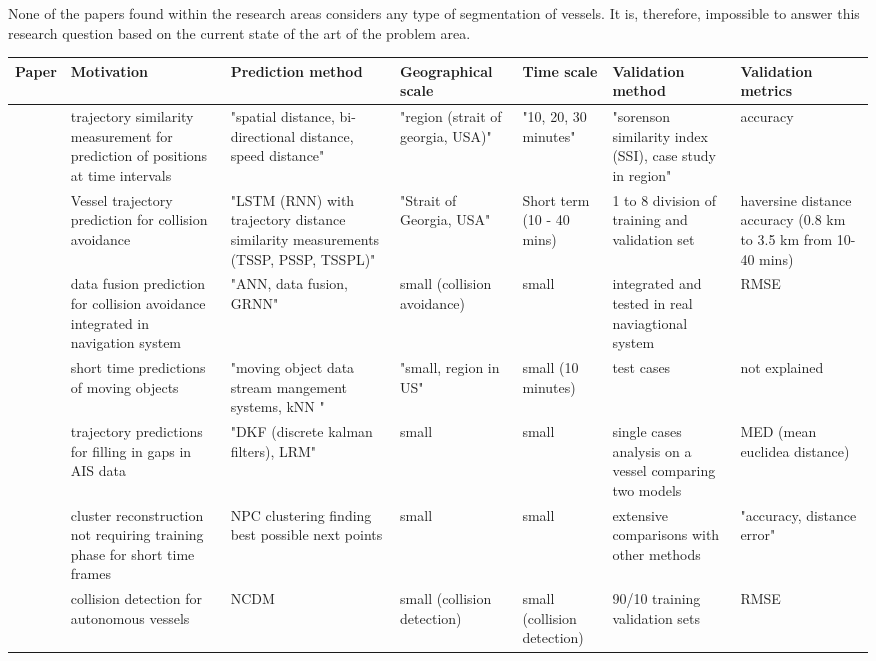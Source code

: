 None of the papers found within the research areas considers any type of segmentation of vessels. It is, therefore, impossible to answer this research question based on the current state of the art of the problem area.


\begin{sidewaystable}
    \centering
    {\small
    \begin{tabular}{|l|l|l|l|l|l|l|}
    \hline
        Paper & Motivation & Prediction method & Geographical scale & Time scale & Validation method & Validation metrics \\ \hline
        \cite{Alizadeh2020PredictionTrajectory} & trajectory similarity measurement for prediction of positions at time intervals & "spatial distance, bi-directional distance, speed distance" & "region (strait of georgia, USA)" & "10, 20, 30 minutes" & "sorenson similarity index (SSI), case study in region" & accuracy \\ \hline
        \cite{Alizadeh2021VesselData} & Vessel trajectory prediction for collision avoidance & "LSTM (RNN) with trajectory distance similarity measurements (TSSP, PSSP, TSSPL)" & "Strait of Georgia, USA" & Short term (10 - 40 mins) & 1 to 8 division of training and validation set & haversine distance accuracy (0.8 km to 3.5 km from 10-40 mins) \\ \hline
        \cite{Borkowski2017TheFusion} & data fusion prediction for collision avoidance integrated in navigation system & "ANN, data fusion, GRNN" & small (collision avoidance) & small & integrated and tested in real naviagtional system & RMSE \\ \hline
        \cite{Brandt2017MovingPrediction} & short time predictions of moving objects & "moving object data stream mangement systems, kNN " & "small, region in US" & small (10 minutes) & test cases & not explained \\ \hline
        \cite{Burger2020DiscretePrediction} & trajectory predictions for filling in gaps in AIS data & "DKF (discrete kalman filters), LRM" & small & small & single cases analysis on a vessel comparing two models & MED (mean euclidea distance) \\ \hline
        \cite{Chen2020ThePrediction} & cluster reconstruction not requiring training phase for short time frames & NPC clustering finding best possible next points & small & small & extensive comparisons with other methods & "accuracy, distance error" \\ \hline
        \cite{Dalsnes2018ThePrediction} & collision detection for autonomous vessels & NCDM & small (collision detection) & small (collision detection) & 90/10 training validation sets & RMSE \\ \hline

\end{tabular}}
\end{sidewaystable}
